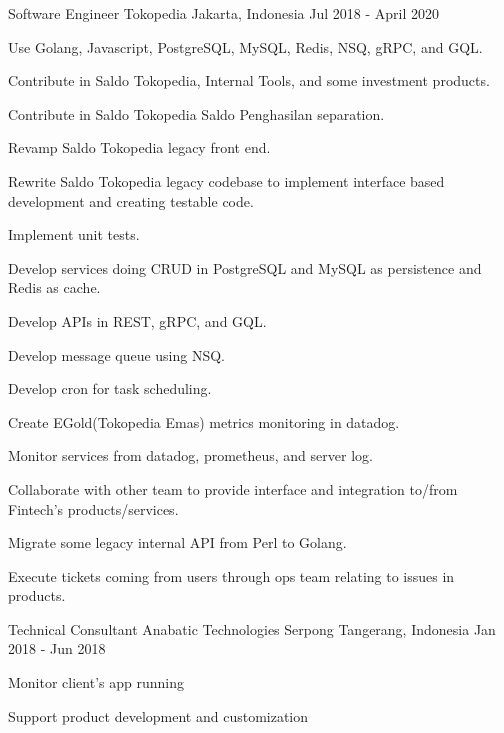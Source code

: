 \begin{cventries}

\cventry
    {Software Engineer}
    {Tokopedia}
    {Jakarta, Indonesia}
    {Jul 2018 - April 2020}
    {
        \begin{cvitems}
            \item {Use Golang, Javascript, PostgreSQL, MySQL, Redis, NSQ, gRPC, and GQL.}
            \item {Contribute in Saldo Tokopedia, Internal Tools, and some investment products.}
            \item {Contribute in Saldo Tokopedia Saldo Penghasilan separation.}
            \item {Revamp Saldo Tokopedia legacy front end.}
            \item {Rewrite Saldo Tokopedia legacy codebase to implement interface based development and creating testable code.}
            \item {Implement unit tests.}
            \item {Develop services doing CRUD in PostgreSQL and MySQL as persistence and Redis as cache.}
            \item {Develop APIs in REST, gRPC, and GQL.}
            \item {Develop message queue using NSQ.}
            \item {Develop cron for task scheduling.}
            \item {Create EGold(Tokopedia Emas) metrics monitoring in datadog.}
            \item {Monitor services from datadog, prometheus, and server log.}
            \item {Collaborate with other team to provide interface and integration to/from Fintech’s products/services.}
            \item {Migrate some legacy internal API from Perl to Golang.}
            \item {Execute tickets coming from users through ops team relating to issues in products.}
        \end{cvitems}
    }

\cventry
    {Technical Consultant}
    {Anabatic Technologies}
    {Serpong Tangerang, Indonesia}
    {Jan 2018 - Jun 2018}
    {
        \begin{cvitems}
            \item {Monitor client's app running}
            \item {Support product development and customization}
        \end{cvitems}
    }


\end{cventries}

